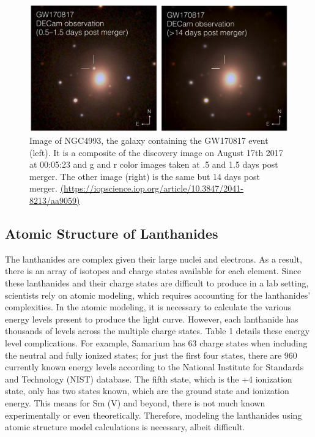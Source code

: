 \documentclass[11pt,a4paper]{article}
\begin{document}
\begin{figure}[h!]
  \includegraphics[scale = .5, width=1\textwidth]{GW170817_pic.png}
  \caption{Image of NGC4993, the galaxy containing the GW170817 event (left). It is a composite of the discovery image on August 17th 2017 at 00:05:23 and g and r color images taken at .5 and 1.5 days post merger. The other image (right) is the same but 14 days post merger. \url{(https://iopscience.iop.org/article/10.3847/2041-8213/aa9059)}}
\end{figure}


\subsection{Atomic Structure of Lanthanides}

The lanthanides are complex given their large nuclei and electrons. As a result, there is an array of isotopes and charge states available for each element. Since these lanthanides and their charge states are difficult to produce in a lab setting, scientists rely on atomic modeling, which requires accounting for the lanthanides' complexities. In the atomic modeling, it is necessary to calculate the various energy levels present to produce the light curve. However, each lanthanide has thousands of levels across the multiple charge states. Table 1 details these energy level complications. For example, Samarium has 63 charge states when including the neutral and fully ionized states; for just the first four states, there are 960 currently known energy levels according to the National Institute for Standards and Technology (NIST) database. The fifth state, which is the +4 ionization state, only has two states known, which are the ground state and ionization energy. This means for Sm (V) and beyond, there is not much known experimentally or even theoretically. Therefore, modeling the lanthanides using atomic structure model calculations is necessary, albeit difficult. 
\end{document}
